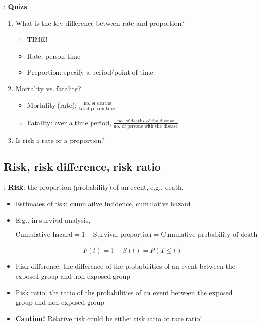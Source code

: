 \begin{frame}{\secname: \subsecname}
\textbf{Quizs}
\begin{enumerate}
\item<2|handout:2->  What is the key difference between rate and proportion?
\begin{itemize}
	\item<3|handout:3-> TIME! 
	\item<3|handout:3-> Rate: person-time
	\item<3|handout:3-> Proportion: specify a period/point of time
\end{itemize}

\item<4|handout:4-> Mortality vs. fatality?
	\begin{itemize}
	\item<5|handout:5-> Mortality (rate): $\frac{\text{no. of deaths}}{\text{total person-time}}$
    \item<5|handout:5-> Fatality: over a time period, $\frac{\text{no. of deaths of the disease}}{\text{no. of persons with the disease}}$
 	
	\end{itemize}

\item<6|handout:6-> Is risk a rate or a proportion?

\end{enumerate}
\end{frame}

\subsection{Risk, risk difference, risk ratio}
\begin{frame}{\secname: \subsecname}
	\textbf{Risk}: the proportion (probability) of an event, e.g., death. \\ 
	\begin{itemize}
		\item<2|handout:2-> Estimates of risk: cumulative incidence, cumulative hazard
		\item<3|handout:3-> E.g., in survival analysis, 

	\small
\[ \text{Cumulative hazard} = 1 - \text{Survival proportion} = \text{Cumulative probability of death}\] \\
	\[ F(t) = 1 - S(t) = P(T\leq t) \]
	\end{itemize}
\begin{itemize}
\normalsize
\item<4|handout:4-> Risk difference: the difference of the probabilities of an event between the exposed group and non-exposed group
\item<5|handout:5-> Risk ratio: the ratio of the probabilities of an event between the exposed group and non-exposed group
\item<6|handout:6> \textbf{Caution!} Relative risk could be either risk ratio or rate ratio! 
\end{itemize}
\end{frame}



